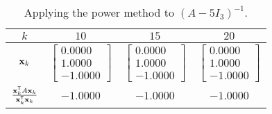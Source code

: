 \begin{activity}
\begin{table}[h]
\begin{center}
\renewcommand{\arraystretch}{2.0}
\begin{tabular}{cccc} \hline
$k$			&$10$		&$15$		&$20$		\\ \hline %
$\mathbf{x}_k$		&$\left[ \begin{array}{r} 0.0000 \\ 1.0000 \\ -1.0000 \end{array} \right]$	&$\left[ \begin{array}{r} 0.0000 \\ 1.0000 \\ -1.0000 \end{array} \right]$	&$\left[ \begin{array}{r} 0.0000 \\ 1.0000 \\ -1.0000 \end{array} \right]$		\\ \hline %
$\frac{\mathbf{x}_k^{\mathsf{T}}A\mathbf{x}_k}{\mathbf{x}_k^{\mathsf{T}}\mathbf{x}_k}$ 	&$-1.0000$	&$-1.0000$	&$-1.0000$		\\ \hline %
\end{tabular}
\caption{Applying the power method to $(A - 5I_3)^{-1}$.}
\label{T:4_e_4}
\end{center}
\end{table}




	\ea
	
\end{activity}

\ExampleIntro

